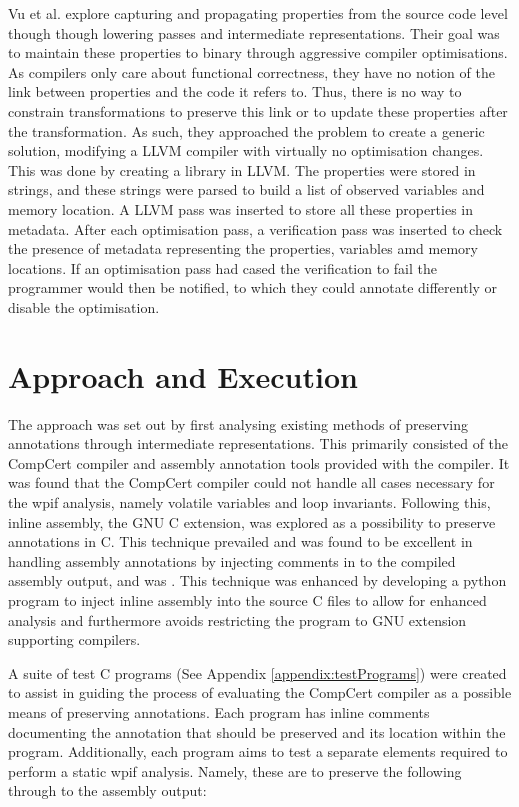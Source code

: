 \documentclass[twocolumn]{article}
\begin{document}
Vu et al. \cite{vu2020secure} explore capturing and propagating properties from the source code level though though lowering passes and intermediate representations. Their goal was to maintain these properties to binary through aggressive compiler optimisations. As compilers only care about functional correctness, they have no notion of the link between properties and the code it refers to. Thus, there is no way to constrain transformations to preserve this link or to update these properties after the transformation. As such, they approached the problem to create a generic solution, modifying a LLVM compiler with virtually no optimisation changes. This was done by creating a library in LLVM. The properties were stored in strings, and these strings were parsed to build a list of observed variables and memory location. A LLVM pass was inserted to store all these properties in metadata. After each optimisation pass, a verification pass was inserted to check the presence of metadata representing the properties, variables amd memory locations. If an optimisation pass had cased the verification to fail the programmer would then be notified, to which they could annotate differently or disable the optimisation.

\pagebreak
\section{Approach and Execution}
The approach was set out by first analysing existing methods of preserving annotations through intermediate representations. This primarily consisted of the CompCert compiler and assembly annotation tools provided with the compiler. It was found that the CompCert compiler could not handle all cases necessary for the wpif analysis, namely volatile variables and loop invariants. Following this, inline assembly, the GNU C extension, was explored as a possibility to preserve annotations in C. This technique prevailed and was found to be excellent in handling assembly annotations by injecting comments in to the compiled assembly output, and was . This technique was enhanced by developing a python program to inject inline assembly into the source C files to allow for enhanced analysis and furthermore avoids restricting the program to GNU extension supporting compilers.

A suite of test C programs (See Appendix \ref{appendix:testPrograms}) were created to assist in guiding the process of evaluating the CompCert compiler as a possible means of preserving annotations. Each program has inline comments documenting the annotation that should be preserved and its location within the program. Additionally, each program aims to test a separate elements required to perform a static wpif analysis. Namely, these are to preserve the following through to the assembly output:
\end{document}
